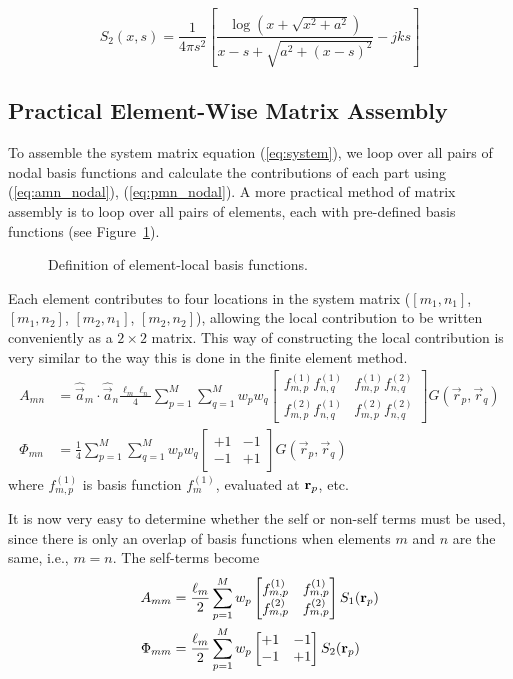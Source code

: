 \begin{equation}
	S_2(x, s) = \frac{1}{4\pi s^2} \left[ \frac{\log\left( x + \sqrt{x^2 + a^2} \right)}{x - s + \sqrt{a^2 + (x - s)^2}} - j k s\right]
\end{equation}

\subsection{Practical Element-Wise Matrix Assembly}
To assemble the system matrix equation (\ref{eq:system}), we loop over all pairs of nodal basis functions and calculate the contributions of each part using (\ref{eq:amn_nodal}), (\ref{eq:pmn_nodal}). A more practical method of matrix assembly is to loop over all pairs of elements, each with pre-defined basis functions (see Figure~\ref{fig:mom_basis4}).
\begin{figure}[b]
	\centering
	
	\caption{Definition of element-local basis functions.}
	\label{fig:mom_basis4}
\end{figure}

Each element contributes to four locations in the system matrix ($[m_1, n_1]$, $[m_1, n_2]$, $[m_2, n_1]$, $[m_2, n_2]$), allowing the local contribution to be written conveniently as a $2 \times 2$ matrix. This way of constructing the local contribution is very similar to the way this is done in the finite element method.
\begin{align}
	A_{mn} & = \hat{\vec{a}}_m \cdot \hat{\vec{a}}_n \frac{\ell_m \ell_n}{4} \sum_{p = 1}^M \sum_{q = 1}^M w_p w_q \begin{bmatrix}
		f_{m,p}^{(1)} f_{n,q}^{(1)} & f_{m,p}^{(1)} f_{n,q}^{(2)} \\
		f_{m,p}^{(2)} f_{n,q}^{(1)} & f_{m,p}^{(2)} f_{n,q}^{(2)}
	\end{bmatrix} G(\vec{r}_p, \vec{r}_q) \\
	\Phi_{mn} & = \frac{1}{4} \sum_{p = 1}^M \sum_{q = 1}^M w_p w_q \begin{bmatrix}
		+1 & -1 \\ -1 & +1
	\end{bmatrix} G(\vec{r}_p, \vec{r}_q)
\end{align}
where $f_{m,p}^{(1)}$ is basis function $f_m^{(1)}$, evaluated at $\mathbf{r}_p$, etc. 

It is now very easy to determine whether the self or non-self terms must be used, since there is only an overlap of basis functions when elements $m$ and $n$ are the same, i.e., $m = n$. The self-terms become
\begin{align}
	A_{mm} & = \frac{\ell_m}{2} \sum_{p = 1}^M w_p \begin{bmatrix}
		f_{m,p}^{(1)} & f_{m,p}^{(1)} \\
		f_{m,p}^{(2)} & f_{m,p}^{(2)}
	\end{bmatrix} S_1(\mathbf{r}_p) \\
	\Phi_{mm} & = \frac{\ell_m}{2} \sum_{p = 1}^M w_p \begin{bmatrix}
		+1 & -1 \\ -1 & +1
	\end{bmatrix} S_2(\mathbf{r}_p)
\end{align}


